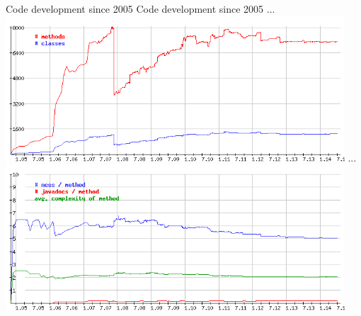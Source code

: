 \createfigure%
{Code development since 2005}%
{Code development since 2005}%
{\label{fig:codedev}}%
{%
  \createsubfigure%
  {...}%
  {\includegraphics[width=0.95\textwidth,angle=0]{extending/figures/nof_classes.png}}%
  {\label{fig:codedev0}}%
  {}%
  \createsubfigure%
  {...}%
	{\includegraphics[width=0.95\textwidth,angle=0]{extending/figures/avg_method.png}}%
  {\label{fig:codedev1}}%
  {}%
}%
{}

